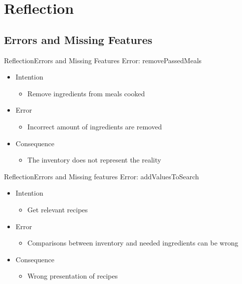 \section{Reflection}
\subsection{Errors and Missing Features}
\begin{frame}{Reflection}{Errors and Missing Features}%
	Error: removePassedMeals 
	\begin{itemize}
		\item Intention
			\begin{itemize}
			\item Remove ingredients from meals cooked
			\end{itemize}
		\item Error
			\begin{itemize}
			\item Incorrect amount of ingredients are removed
			\end{itemize}
		\item Consequence
			\begin{itemize}
			\item The inventory does not represent the reality
			\end{itemize}
	\end{itemize}
\end{frame}
\begin{frame}{Reflection}{Errors and Missing features}	
		Error: addValuesToSearch
		\begin{itemize}
			\item Intention
				\begin{itemize}
				\item Get relevant recipes
				\end{itemize}
			\item Error
				\begin{itemize}
				\item Comparisons between inventory and needed ingredients can be wrong 
				\end{itemize}
			\item Consequence
				\begin{itemize}
				\item Wrong presentation of recipes
				\end{itemize}
		\end{itemize}
\end{frame}

